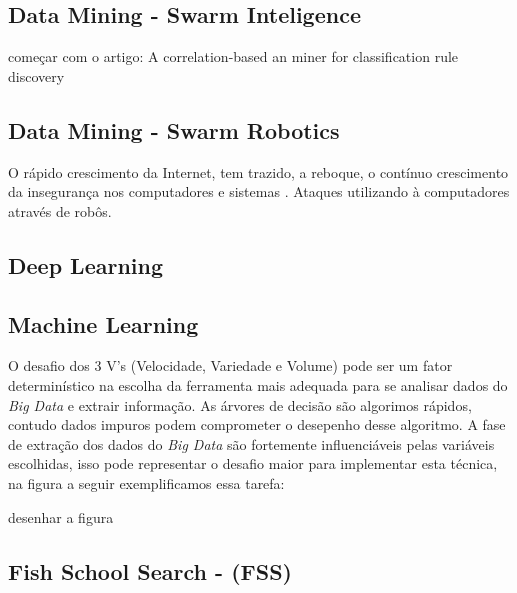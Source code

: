 \documentclass[conference,compsoc]{IEEEtran}
\begin{document}
\subsection{Data Mining - Swarm Inteligence}\label{arte:palavraChave:Swarm}

começar com o artigo: A correlation-based an miner for classification rule discovery

\subsection{Data Mining - Swarm Robotics}\label{arte:palavraChave:Robotics}

O rápido crescimento da Internet, tem trazido, a reboque, o contínuo crescimento da insegurança nos computadores e sistemas \cite{Barford2007}.
Ataques utilizando à computadores através de robôs.

\subsection{Deep Learning}\label{arte:palavraChave:Deep}



\subsection{Machine Learning}\label{arte:palavraChave:Machine}

O desafio dos 3 V's (Velocidade, Variedade e Volume) pode ser um fator determinístico na escolha da ferramenta mais adequada para se analisar dados do \textit{Big Data} e extrair informação. As árvores de decisão são algorimos rápidos, contudo dados impuros podem comprometer o desepenho desse algoritmo. A fase de extração dos dados do \textit{Big Data} são fortemente influenciáveis pelas variáveis escolhidas, \cite{DecisionTree} isso pode representar o desafio maior para implementar esta técnica, na figura a seguir exemplificamos essa tarefa:

desenhar a figura






\subsection{Fish School Search - (FSS) }\label{arte:algo:fss}
\end{document}
